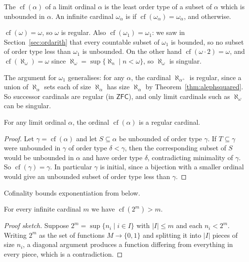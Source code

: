 \documentclass[a4paper]{scrartcl}
\newcommand{\cf}{\operatorname{cf}}
\newcommand{\ZFC}{\mathsf{ZFC}}
\begin{document}
\begin{definition}[Cofinality]
  The  $\cf(\alpha)$ of a limit ordinal $\alpha$ is the least order type of a subset of $\alpha$ which is unbounded in $\alpha$. An infinite cardinal $\omega_\alpha$ is  if $\cf(\omega_\alpha) = \omega_\alpha$, and  otherwise.
\end{definition}

\begin{example}
  $\cf(\omega) = \omega$, so $\omega$ is regular. Also $\cf(\omega_1) = \omega_1$: we saw in Section~\ref{sec:ordarith} that every countable subset of $\omega_1$ is bounded, so no subset of order type less than $\omega_1$ is unbounded. On the other hand $\cf(\omega \cdot 2) = \omega$, and $\cf(\aleph_\omega) = \omega$ since $\aleph_\omega = \sup\{\aleph_n \mid n < \omega\}$, so $\aleph_\omega$ is singular.
\end{example}

The argument for $\omega_1$ generalises: for any $\alpha$, the cardinal $\aleph_{\alpha^+}$ is regular, since a union of $\aleph_\alpha$ sets each of size $\aleph_\alpha$ has size $\aleph_\alpha$ by Theorem~\ref{thm:alephsquared}. So successor cardinals are regular (in $\ZFC$), and only limit cardinals such as $\aleph_\omega$ can be singular.

\begin{proposition}
  For any limit ordinal $\alpha$, the ordinal $\cf(\alpha)$ is a regular cardinal.
\end{proposition}
\begin{proof}
  Let $\gamma = \cf(\alpha)$ and let $S \subseteq \alpha$ be unbounded of order type $\gamma$. If $T \subseteq \gamma$ were unbounded in $\gamma$ of order type $\delta < \gamma$, then the corresponding subset of $S$ would be unbounded in $\alpha$ and have order type $\delta$, contradicting minimality of $\gamma$. So $\cf(\gamma) = \gamma$. In particular $\gamma$ is initial, since a bijection with a smaller ordinal would give an unbounded subset of order type less than $\gamma$.
\end{proof}

Cofinality bounds exponentiation from below.

\begin{theorem}[K\"onig]
  For every infinite cardinal $m$ we have $\cf(2^m) > m$.
\end{theorem}
\begin{proof}[Proof sketch]
  Suppose $2^m = \sup\{n_i \mid i \in I\}$ with $|I| \leq m$ and each $n_i < 2^m$. Writing $2^m$ as the set of functions $M \to \{0,1\}$ and splitting it into $|I|$ pieces of size $n_i$, a diagonal argument produces a function differing from everything in every piece, which is a contradiction.
\end{proof}
\end{document}
